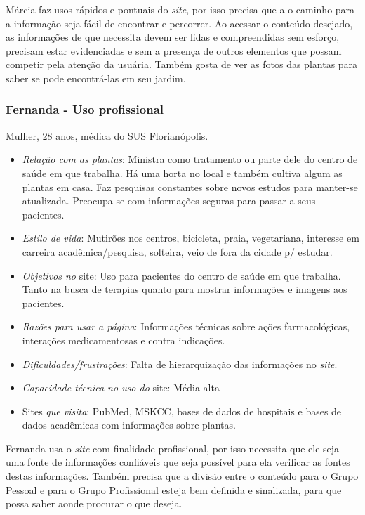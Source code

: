 Márcia faz usos rápidos e pontuais do \emph{site}, por isso precisa que a o caminho para a informação seja fácil de encontrar e percorrer. Ao acessar o conteúdo desejado, as informações de que necessita devem ser lidas e compreendidas sem esforço, precisam estar evidenciadas e sem a presença de outros elementos que possam competir pela atenção da usuária. Também gosta de ver as fotos das plantas para saber se pode encontrá-las em seu jardim.

\subsubsection{Fernanda - Uso profissional}

Mulher, 28 anos, médica do SUS Florianópolis.

\begin{itemize}
\item
  \emph{Relação com as plantas}: Ministra como tratamento ou parte dele do centro de saúde em que trabalha. Há uma horta no local e também cultiva algum as plantas em casa. Faz pesquisas constantes sobre novos estudos para manter-se atualizada. Preocupa-se com informações seguras para passar a seus pacientes.
\item
  \emph{Estilo de vida}: Mutirões nos centros, bicicleta, praia, vegetariana, interesse em carreira acadêmica/pesquisa, solteira, veio de fora da cidade p/ estudar.
\item
  \emph{Objetivos no} site: Uso para pacientes do centro de saúde em que trabalha. Tanto na busca de terapias quanto para mostrar informações e imagens aos pacientes.
\item
  \emph{Razões para usar a página}: Informações técnicas sobre ações farmacológicas, interações medicamentosas e contra indicações.
\item
  \emph{Dificuldades/frustrações}: Falta de hierarquização das informações no \emph{site}.
\item
  \emph{Capacidade técnica no uso do} site: Média-alta
\item
  Sites \emph{que visita}: PubMed, MSKCC, bases de dados de hospitais e bases de dados acadêmicas com informações sobre plantas.
\end{itemize}

Fernanda usa o \emph{site} com finalidade profissional, por isso necessita que ele seja uma fonte de informações confiáveis que seja possível para ela verificar as fontes destas informações. Também precisa que a divisão entre o conteúdo para o Grupo Pessoal e para o Grupo Profissional esteja bem definida e sinalizada, para que possa saber aonde procurar o que deseja.

